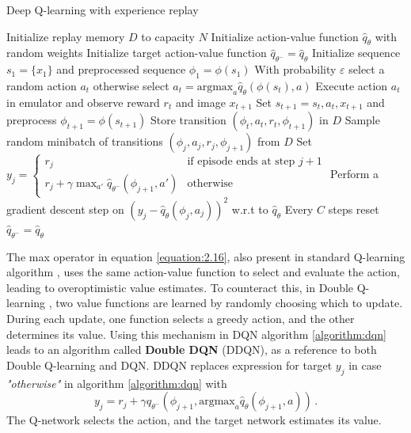 \begin{algorithm}
	\caption{Deep Q-learning with experience replay}\label{algorithm:dqn}
	\begin{algorithmic}
	\State Initialize replay memory $D$ to capacity $N$
	\State Initialize action-value function $\hat{q}_\theta$ with random weights
	\State Initialize target action-value function $\hat{q}_{\theta^-} = \hat{q}_\theta$
		\State Initialize sequence $s_1 = \{x_1\}$ and preprocessed sequence $\phi_1 = \phi(s_1)$
			\State With probability $\varepsilon$ select a random action $a_t$
			\State otherwise select $a_t = \text{argmax}_a \hat{q}_\theta(\phi(s_t), a)$
			\State Execute action $a_t$ in emulator and observe reward $r_t$ and image $x_{t+1}$
			\State Set $s_{t+1} = s_t, a_t, x_{t+1}$ and preprocess $\phi_{t+1} = \phi(s_{t+1})$
			\State Store transition $(\phi_t, a_t, r_t, \phi_{t+1})$ in $D$
			\State Sample random minibatch of transitions $(\phi_j, a_j, r_j, \phi_{j+1})$ from $D$
			\State Set $ y_j = \begin{cases} r_j & \mbox{if episode ends at step } j+1 \\ r_j + \gamma \max_{a'}\hat{q}_{\theta^-}(\phi_{j+1}, a') & \mbox{otherwise} \end{cases}$
			\State Perform a gradient descent step on $(y_j - \hat{q}_\theta(\phi_j, a_j))^2$ w.r.t to $\hat{q}_\theta$
			\State Every $C$ steps reset $\hat{q}_{\theta^-} = \hat{q}_{\theta}$
		\EndFor
	\EndFor
\end{algorithmic}
\end{algorithm}

The max operator in equation \ref{equation:2.16}, also present in standard Q-learning algorithm \cite{watkins1992q}, uses the same action-value function to select and evaluate the action, leading to overoptimistic value estimates. To counteract this, in Double Q-learning \cite{hasselt2010double}, two value functions are learned by randomly choosing which to update. During each update, one function selects a greedy action, and the other determines its value. Using this mechanism in DQN algorithm \ref{algorithm:dqn} leads to an algorithm called \textbf{Double DQN} \label{Double DQN} \cite{Hasselt_Guez_Silver_2016} (DDQN), as a reference to both Double Q-learning and DQN. DDQN replaces expression for target $y_j$ in case \textit{"otherwise"} in algorithm \ref{algorithm:dqn} with \cite{Hasselt_Guez_Silver_2016}
\begin{equation}
	y_j = r_j + \gamma \hat{q}_{\theta^-}(\phi_{j+1}, \text{argmax}_a \hat{q}_\theta(\phi_{j+1}, a)) \, .
\end{equation}
The Q-network selects the action, and the target network estimates its value.
